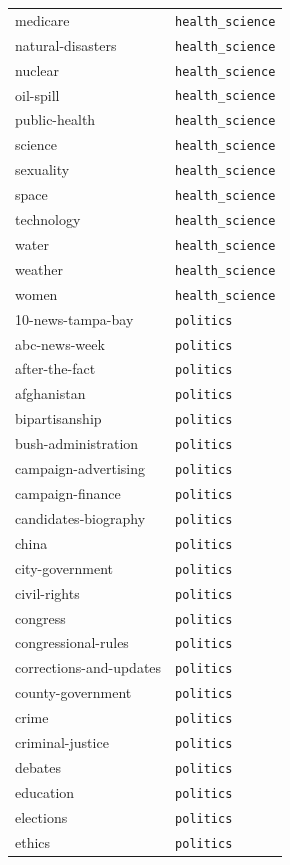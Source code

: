 \begin{longtable}{ll}
medicare & \texttt{health\_science} \\
natural-disasters & \texttt{health\_science} \\
nuclear & \texttt{health\_science} \\
oil-spill & \texttt{health\_science} \\
public-health & \texttt{health\_science} \\
science & \texttt{health\_science} \\
sexuality & \texttt{health\_science} \\
space & \texttt{health\_science} \\
technology & \texttt{health\_science} \\
water & \texttt{health\_science} \\
weather & \texttt{health\_science} \\
women & \texttt{health\_science} \\
\midrule
10-news-tampa-bay & \texttt{politics} \\
abc-news-week & \texttt{politics} \\
after-the-fact & \texttt{politics} \\
afghanistan & \texttt{politics} \\
bipartisanship & \texttt{politics} \\
bush-administration & \texttt{politics} \\
campaign-advertising & \texttt{politics} \\
campaign-finance & \texttt{politics} \\
candidates-biography & \texttt{politics} \\
china & \texttt{politics} \\
city-government & \texttt{politics} \\
civil-rights & \texttt{politics} \\
congress & \texttt{politics} \\
congressional-rules & \texttt{politics} \\
corrections-and-updates & \texttt{politics} \\
county-government & \texttt{politics} \\
crime & \texttt{politics} \\
criminal-justice & \texttt{politics} \\
debates & \texttt{politics} \\
education & \texttt{politics} \\
elections & \texttt{politics} \\
ethics & \texttt{politics} \\

\end{longtable}
